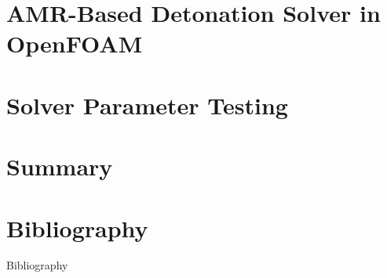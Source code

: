 \documentclass[aspectratio=169]{beamer}
\begin{document}
  \section{AMR-Based Detonation Solver in OpenFOAM}

  \section{Solver Parameter Testing}

  \section{Summary}

\section{Bibliography}
\begin{frame}[allowframebreaks]{Bibliography}
\nocite{*}		%

\end{frame}
\end{document}
